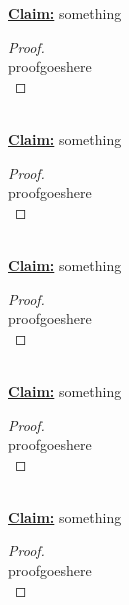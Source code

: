 \documentclass[12pt]{article}
\begin{document}
\underline{\textbf{Claim:}} something \\
\begin{proof}
\leavevmode\\
    proofgoeshere \\
\end{proof}
\leavevmode\\
\underline{\textbf{Claim:}} something \\
\begin{proof}
\leavevmode\\
    proofgoeshere \\
\end{proof}
\leavevmode\\
\underline{\textbf{Claim:}} something \\
\begin{proof}
\leavevmode\\
    proofgoeshere \\
\end{proof}
\leavevmode\\
\underline{\textbf{Claim:}} something \\
\begin{proof}
\leavevmode\\
    proofgoeshere \\
\end{proof}
\leavevmode\\
\underline{\textbf{Claim:}} something \\
\begin{proof}
\leavevmode\\
    proofgoeshere \\
\end{proof}
\pagebreak
\end{document}
